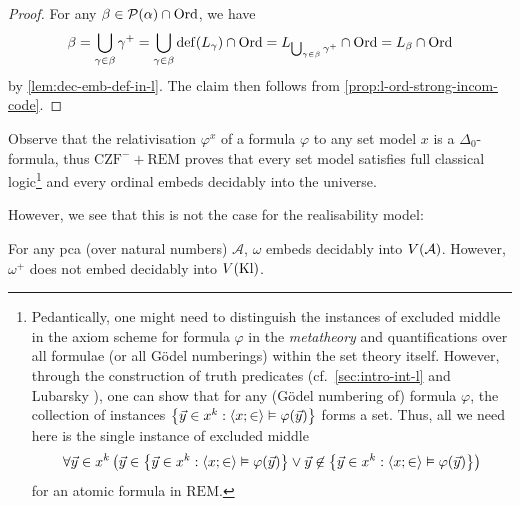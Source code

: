\documentclass[12pt,openany]{book}
\theoremstyle{plain}
\theoremstyle{definition}
\newcommand\uppar[1]{{\upshape(}#1{\upshape)}}
\newcommand\tuple[1]{\left\langle #1 \right\rangle}
\newcommand\opA[1]{\mathop{\forall #1}}
\newcommand\Pow{\mathcal{P}}
\DeclareMathOperator\dd{def}
\newcommand\CZF{\mathrm{CZF}}
\newcommand\REM{\mathrm{REM}}
\newcommand\Ord{\mathrm{Ord}}
\newcommand\Kl{\mathrm{Kl}}
\begin{document}
\begin{proof}
  For any $\beta \in \Pow\mleft(\alpha\mright) \cap \Ord$, we have
  \[\beta = \bigcup_{\gamma \in \beta} \gamma^+ = \bigcup_{\gamma \in \beta} \dd\mleft(L_\gamma\mright) \cap \Ord = L_{\bigcup_{\gamma \in \beta} \gamma^+} \cap \Ord = L_\beta \cap \Ord\]
  by \autoref{lem:dec-emb-def-in-l}. The claim then follows from \autoref{prop:l-ord-strong-incom-code}.
\end{proof}

Observe that the relativisation $\varphi^x$ of a formula $\varphi$ to any set model $x$ is a $\Delta_0$-formula, thus $\CZF^- + \REM$ proves that every set model satisfies full classical logic\footnote{Pedantically, one might need to distinguish the instances of excluded middle in the axiom scheme for formula $\varphi$ in the \emph{metatheory} and quantifications over all formulae (or all G\"odel numberings) within the set theory itself. However, through the construction of truth predicates (cf.\ \autoref{sec:intro-int-l} and Lubarsky \cite{lubarsky93-intuitionistic-l}), one can show that for any (G\"odel numbering of) formula $\varphi$, the collection of instances $\left\{\vec{y} \in x^k : \tuple{x; \in} \vDash \varphi\mleft(\vec{y}\mright)\right\}$ forms a set. Thus, all we need here is the single instance of excluded middle
  \[\opA{\vec{y} \in x^k} \left(\vec{y} \in \left\{\vec{y} \in x^k : \tuple{x; \in} \vDash \varphi\mleft(\vec{y}\mright)\right\} \lor \vec{y} \not\in \left\{\vec{y} \in x^k : \tuple{x; \in} \vDash \varphi\mleft(\vec{y}\mright)\right\}\right)\]
  for an atomic formula in $\REM$.} and every ordinal embeds decidably into the universe.

However, we see that this is not the case for the realisability model:
\begin{proposition}
  \label{prop:vkl-omega-suc-not-cl}
  For any pca \uppar{over natural numbers} $\mathcal{A}$, $\omega$ embeds decidably into $V\mleft(\mathcal{A}\mright)$. However, $\omega^+$ does not embed decidably into $V\mleft(\Kl\mright)$.
\end{proposition}
\end{document}
